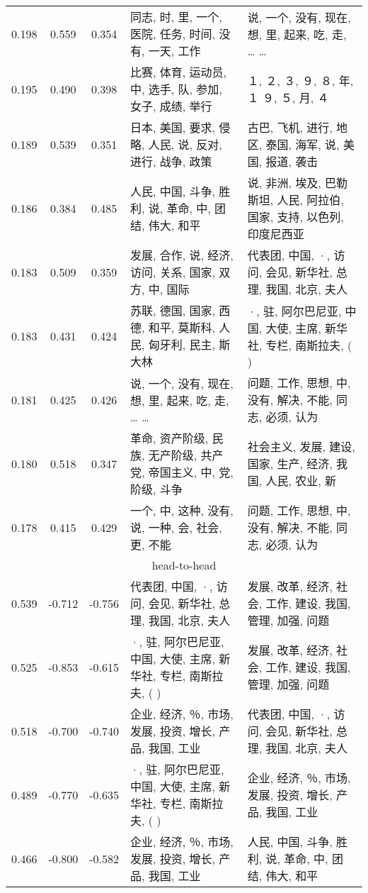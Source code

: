 \begin{tabular}{cccp{5cm}p{5cm}}
0.198 & 0.559 & 0.354 & 同志, 时, 里, 一个, 医院, 任务, 时间, 没有, 一天, 工作 & 说, 一个, 没有, 现在, 想, 里, 起来, 吃, 走, … … \\
0.195 & 0.490 & 0.398 & 比赛, 体育, 运动员, 中, 选手, 队, 参加, 女子, 成绩, 举行 & １, ２, ３, ９, ８, 年, １ ９, ５, 月, ４ \\
0.189 & 0.539 & 0.351 & 日本, 美国, 要求, 侵略, 人民, 说, 反对, 进行, 战争, 政策 & 古巴, 飞机, 进行, 地区, 泰国, 海军, 说, 美国, 报道, 袭击 \\
0.186 & 0.384 & 0.485 & 人民, 中国, 斗争, 胜利, 说, 革命, 中, 团结, 伟大, 和平 & 说, 非洲, 埃及, 巴勒斯坦, 人民, 阿拉伯, 国家, 支持, 以色列, 印度尼西亚 \\
0.183 & 0.509 & 0.359 & 发展, 合作, 说, 经济, 访问, 关系, 国家, 双方, 中, 国际 & 代表团, 中国, ·, 访问, 会见, 新华社, 总理, 我国, 北京, 夫人 \\
0.183 & 0.431 & 0.424 & 苏联, 德国, 国家, 西德, 和平, 莫斯科, 人民, 匈牙利, 民主, 斯大林 & ·, 驻, 阿尔巴尼亚, 中国, 大使, 主席, 新华社, 专栏, 南斯拉夫, ( ) \\
0.181 & 0.425 & 0.426 & 说, 一个, 没有, 现在, 想, 里, 起来, 吃, 走, … … & 问题, 工作, 思想, 中, 没有, 解决, 不能, 同志, 必须, 认为 \\
0.180 & 0.518 & 0.347 & 革命, 资产阶级, 民族, 无产阶级, 共产党, 帝国主义, 中, 党, 阶级, 斗争 & 社会主义, 发展, 建设, 国家, 生产, 经济, 我国, 人民, 农业, 新 \\
0.178 & 0.415 & 0.429 & 一个, 中, 这种, 没有, 说, 一种, 会, 社会, 更, 不能 & 问题, 工作, 思想, 中, 没有, 解决, 不能, 同志, 必须, 认为 \\
\midrule
\multicolumn{5}{c}{head-to-head}\\
0.539 & -0.712 & -0.756 & 代表团, 中国, ·, 访问, 会见, 新华社, 总理, 我国, 北京, 夫人 & 发展, 改革, 经济, 社会, 工作, 建设, 我国, 管理, 加强, 问题 \\
0.525 & -0.853 & -0.615 & ·, 驻, 阿尔巴尼亚, 中国, 大使, 主席, 新华社, 专栏, 南斯拉夫, ( ) & 发展, 改革, 经济, 社会, 工作, 建设, 我国, 管理, 加强, 问题 \\
0.518 & -0.700 & -0.740 & 企业, 经济, ％, 市场, 发展, 投资, 增长, 产品, 我国, 工业 & 代表团, 中国, ·, 访问, 会见, 新华社, 总理, 我国, 北京, 夫人 \\
0.489 & -0.770 & -0.635 & ·, 驻, 阿尔巴尼亚, 中国, 大使, 主席, 新华社, 专栏, 南斯拉夫, ( ) & 企业, 经济, ％, 市场, 发展, 投资, 增长, 产品, 我国, 工业 \\
0.466 & -0.800 & -0.582 & 企业, 经济, ％, 市场, 发展, 投资, 增长, 产品, 我国, 工业 & 人民, 中国, 斗争, 胜利, 说, 革命, 中, 团结, 伟大, 和平 \\

\end{tabular}
